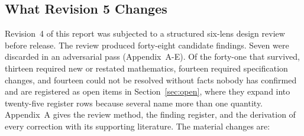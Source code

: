 \subsection{What Revision 5 Changes}

Revision~4 of this report was subjected to a structured six-lens design review before release. The review produced forty-eight candidate findings. Seven were discarded in an adversarial pass (Appendix~A-E). Of the forty-one that survived, thirteen required new or restated mathematics, fourteen required specification changes, and fourteen could not be resolved without facts nobody has confirmed and are registered as open items in Section~\ref{sec:open}, where they expand into twenty-five register rows because several name more than one quantity. Appendix~A gives the review method, the finding register, and the derivation of every correction with its supporting literature. The material changes are:


